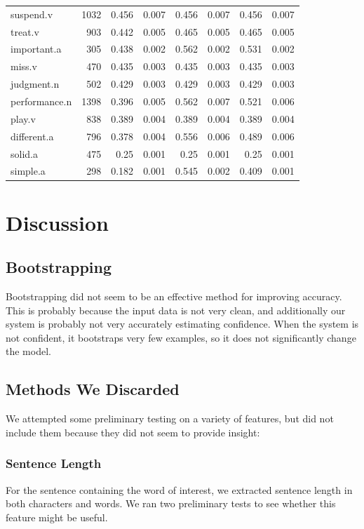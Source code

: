 \documentclass{article}
\begin{document}
\begin{longtable}{l | r r r r r r r}
suspend.v	&	1032	&	0.456	&	0.007	&	0.456	&	0.007	&	0.456	&	0.007\\
treat.v	&	903	&	0.442	&	0.005	&	0.465	&	0.005	&	0.465	&	0.005\\
important.a	&	305	&	0.438	&	0.002	&	0.562	&	0.002	&	0.531	&	0.002\\
miss.v	&	470	&	0.435	&	0.003	&	0.435	&	0.003	&	0.435	&	0.003\\
judgment.n	&	502	&	0.429	&	0.003	&	0.429	&	0.003	&	0.429	&	0.003\\
performance.n	&	1398	&	0.396	&	0.005	&	0.562	&	0.007	&	0.521	&	0.006\\
play.v	&	838	&	0.389	&	0.004	&	0.389	&	0.004	&	0.389	&	0.004\\
different.a	&	796	&	0.378	&	0.004	&	0.556	&	0.006	&	0.489	&	0.006\\
solid.a	&	475	&	0.25	&	0.001	&	0.25	&	0.001	&	0.25	&	0.001\\
simple.a	&	298	&	0.182	&	0.001	&	0.545	&	0.002	&	0.409	&	0.001\\

\end{longtable}

\section{Discussion}

\subsection{Bootstrapping}

Bootstrapping did not seem to be an effective method for improving accuracy.  This is probably because the input data is not very clean, and additionally our system is probably not very accurately estimating confidence.  When the system is not confident, it bootstraps very few examples, so it does not significantly change the model.

\subsection{Methods We Discarded}

We attempted some preliminary testing on a variety of features, but did not include them because they did not seem to provide insight:

\subsubsection{Sentence Length} For the sentence containing the word of
interest, we extracted sentence length in both characters and words. We ran two
preliminary tests to see whether this feature might be useful.
\end{document}
